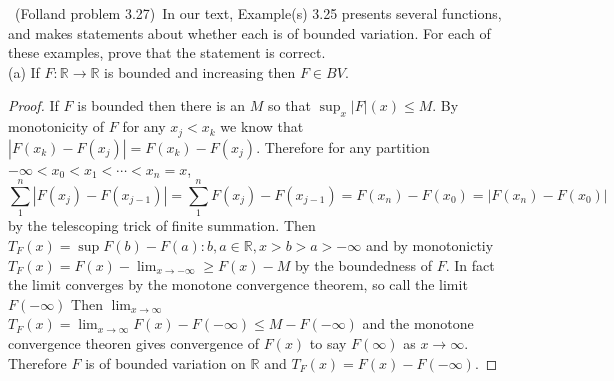 \documentclass[11pt]{amsart}
\theoremstyle{definition}
\numberwithin{theorem}{section}
\numberwithin{definition}{section}
\numberwithin{equation}{section}
\begin{document}
\medskip {}\ (Folland problem 3.27)\ 
In our text, Example(s) 3.25 presents several functions, and makes statements about whether
each is of bounded variation. For each of these examples, prove that the statement is
correct. \\
(a) If $F : \mathbb{R} \to \mathbb{R}$ is bounded and increasing then $F \in BV$.
\begin{proof}
	If $F$ is bounded then there is an $M$ so that $\sup_x {|F|(x)} \leq M$. By monotonicity of $F$ for any $x_j < x_k$ we know
	that $|F(x_k) - F(x_j)| = F(x_k) - F(x_j)$. Therefore for any partition $-\infty < x_0 < x_1 < \cdots < x_n =x$,
	\begin{equation*}
		\sum_{1}^n |F(x_j) - F(x_{j-1})| = \sum_{1}^n F(x_j) - F(x_{j-1}) = F(x_n) - F(x_0) =  | F(x_n) - F(x_0)|
	\end{equation*}
	by the telescoping trick of finite summation. Then $T_F(x) = \sup{F(b)- F(a): b,a \in \mathbb{R}, x > b>a > -\infty}$
	and by monotonictiy $T_F(x) = F(x) - \lim_{x \to -\infty} \geq F(x) - M$ by the boundedness of $F$. In fact the limit converges by the monotone convergence theorem, so call the limit $F(-\infty)$ Then $\lim_{x\to \infty}$
	$T_F(x) = \lim_{x\to \infty}F(x) - F(-\infty) \leq M - F(-\infty)$ and the monotone convergence theoren gives convergence of $F(x)$ to
	say $F(\infty)$ as $x \to \infty.$ Therefore $F$ is of bounded variation on $\mathbb{R}$ and $T_F(x) = F(x) - F(-\infty).$
\end{proof}
\end{document}
